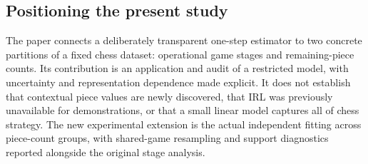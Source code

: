 \subsection{Positioning the present study}
The paper connects a deliberately transparent one-step estimator to two concrete partitions of a fixed chess dataset: operational game stages and remaining-piece counts. Its contribution is an application and audit of a restricted model, with uncertainty and representation dependence made explicit. It does not establish that contextual piece values are newly discovered, that IRL was previously unavailable for demonstrations, or that a small linear model captures all of chess strategy. The new experimental extension is the actual independent fitting across piece-count groups, with shared-game resampling and support diagnostics reported alongside the original stage analysis.